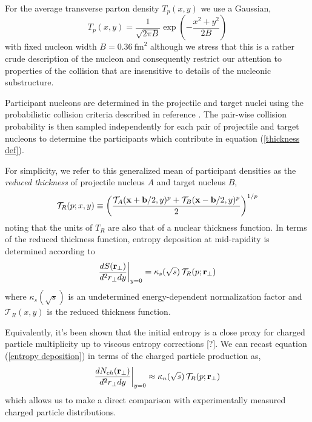 \documentclass[aps,prl,reprint,amsmath,nofootinbib]{revtex4-1}
\begin{document}
For the average transverse parton density $T_p(x,y)$ we use a Gaussian,
\begin{equation}
 T_p(x,y) = \frac{1}{\sqrt{2 \pi B}} \exp\left(-\frac{x^2+y^2}{2 B}\right) 
\end{equation}
with fixed nucleon width $B=0.36 ~\mathrm{fm}^2$ although we stress that this is a rather crude description of the nucleon and consequently restrict our attention 
to properties of the collision that are insensitive to details of the nucleonic substructure.

Participant nucleons are determined in the projectile and target nuclei using the probabilistic collision criteria described in reference \cite{proton-proton}. 
The pair-wise collision probability is then sampled independently for each pair of projectile and target nucleons to determine the participants which contribute in 
equation (\ref{thickness def}).

For simplicity, we refer to this generalized mean of participant densities as the \emph{reduced thickness} of projectile nucleus $A$ and target nucleus $B$,
\begin{equation}
 \label{reduced}
 \mathcal{T}_R(p;x,y) \equiv \left( \frac{\mathcal{T}_A({\bf x}+{\bf b}/2,y)^p + \mathcal{T}_B({\bf x}-{\bf b}/2,y)^p}{2} \right)^{1/p}
\end{equation}
noting that the units of $T_R$ are also that of a nuclear thickness function. In terms of the reduced thickness function, entropy deposition at mid-rapidity is 
determined according to
\begin{equation}
 \label{entropy deposition}
 \frac{dS({\bf r}_\perp)}{d^2r_\perp dy} \biggr \rvert_{y=0} = \kappa_s(\sqrt{s})\, \mathcal{T}_R(p;{\bf r}_\perp)
\end{equation}
where $\kappa_s(\sqrt{s})$ is an undetermined energy-dependent normalization factor and $\mathcal{T}_R(x,y)$ is the reduced thickness function.

Equivalently, it's been shown that the initial entropy is a close proxy for charged particle multiplicity up to viscous entropy corrections [?]. We can 
recast equation (\ref{entropy deposition}) in terms of the charged particle production as,
\begin{equation}
 \label{particle production}
 \frac{dN_{ch}({\bf r}_\perp)}{d^2r_\perp dy} \biggr \rvert_{y=0} \approx \kappa_n(\sqrt{s})\, \mathcal{T}_R(p;{\bf r}_\perp)
\end{equation}
which allows us to make a direct comparison with experimentally measured charged particle distributions.
\end{document}
